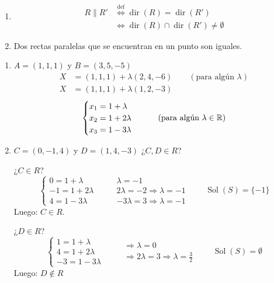 \documentclass[11pt,a4paper]{article}
\DeclareMathOperator{\Sol}{Sol}
\DeclareMathOperator{\dir}{dir}
\begin{document}
\begin{observacion}\leavevmode
\begin{enumerate}[label=(\arabic*)]
  \item
  \begin{align*}
  R\parallel R'&\overset{\text{def}}{\iff}\dir(R)=\dir(R')\\
  &\iff\dir(R)\cap\dir(R')\neq\emptyset
  \end{align*}
  \item Dos rectas paralelas que se encuentran en un punto son iguales.
\end{enumerate}
\end{observacion}

\begin{ejemplo}\label{ej:recta}\leavevmode
\begin{enumerate}[label=(\arabic*)]
  \item $A=(1,1,1)$ y $B=(3,5,-5)$
  \begin{align*}
  X&=(1,1,1)+\lambda(2,4,-6)\qquad(\text{para algún }\lambda)\\
  X&=(1,1,1)+\lambda(1,2,-3)
  \end{align*}
  \[
  \begin{cases}
  x_1=1+\lambda\\
  x_2=1+2\lambda\\
  x_3=1-3\lambda
  \end{cases}
  \qquad(\text{para algún }\lambda\in\mathbb{R})
  \]
  \item $C=(0,-1,4)$ y $D=(1,4,-3)$ \qquad ¿$C,D\in R$?

  ¿$C\in R$?
  \[
  \begin{cases}
  0=1+\lambda\\
  -1=1+2\lambda\\
  4=1-3\lambda
  \end{cases}
  \qquad
  \begin{array}{l}
  \lambda=-1\\
  2\lambda=-2\Rightarrow\lambda=-1\\
  -3\lambda=3\Rightarrow\lambda=-1
  \end{array}
  \qquad\Sol(S)=\{-1\}
  \]
  Luego: $C\in R$.

  ¿$D\in R$?
  \[
  \begin{cases}
  1=1+\lambda\\
  4=1+2\lambda\\
  -3=1-3\lambda
  \end{cases}
  \qquad
  \begin{array}{l}
  \Rightarrow\lambda=0\\
  \Rightarrow2\lambda=3\Rightarrow\lambda=\frac32
  \end{array}
  \qquad\Sol(S)=\emptyset
  \]
  Luego: $D\notin R$
\end{enumerate}
\end{ejemplo}
\end{document}
